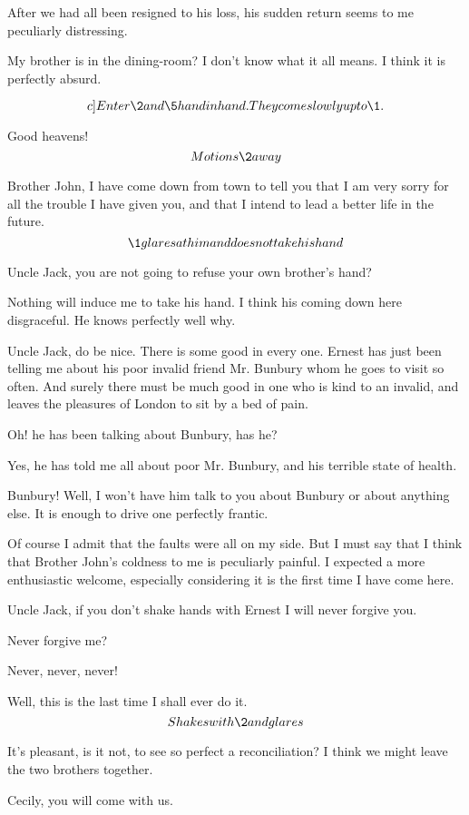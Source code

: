 \documentclass{book}
\begin{document}
\6  After we had all been resigned to his loss, his sudden
return seems to me peculiarly distressing.

\1  My brother is in the dining-room?  I don't know what it all
means.  I think it is perfectly absurd.

\[c]Enter \2 and \5 hand in hand.\\  They come slowly up to
\1.\]

\1  Good heavens!  \[Motions \2 away\]

\2  Brother John, I have come down from town to tell you
that I am very sorry for all the trouble I have given you, and that
I intend to lead a better life in the future.  \[\1 glares at him
and does not take his hand\]

\5  Uncle Jack, you are not going to refuse your own brother's
hand?

\1  Nothing will induce me to take his hand.  I think his coming
down here disgraceful.  He knows perfectly well why.

\5  Uncle Jack, do be nice.  There is some good in every one.
Ernest has just been telling me about his poor invalid friend Mr.
Bunbury whom he goes to visit so often.  And surely there must be
much good in one who is kind to an invalid, and leaves the
pleasures of London to sit by a bed of pain.

\1  Oh! he has been talking about Bunbury, has he?

\5  Yes, he has told me all about poor Mr. Bunbury, and his
terrible state of health.

\1  Bunbury!  Well, I won't have him talk to you about Bunbury
or about anything else.  It is enough to drive one perfectly
frantic.

\2  Of course I admit that the faults were all on my side.
But I must say that I think that Brother John's coldness to me is
peculiarly painful.  I expected a more enthusiastic welcome,
especially considering it is the first time I have come here.

\5  Uncle Jack, if you don't shake hands with Ernest I will
never forgive you.

\1  Never forgive me?

\5  Never, never, never!

\1  Well, this is the last time I shall ever do it.  \[Shakes
with \2 and glares\]

\7  It's pleasant, is it not, to see so perfect a
reconciliation?  I think we might leave the two brothers together.

\6  Cecily, you will come with us.
\end{document}
